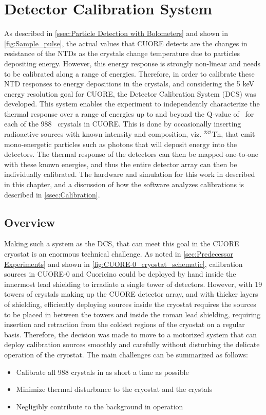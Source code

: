 \chapter{Detector Calibration System}
\label{chap:DCS}

As described in \autoref{ssec:Particle Detection with Bolometers} and shown in \autoref{fig:Sample_pulse}, the actual values that CUORE detects are the changes in resistance of the NTDs as the crystals change temperature due to particles depositing energy.
However, this energy response is strongly non-linear and needs to be calibrated along a range of energies.
Therefore, in order to calibrate these NTD responses to energy depositions in the crystals, and considering the 5 keV energy resolution goal for CUORE, the Detector Calibration System (DCS) was developed.
This system enables the experiment to independently characterize the thermal response over a range of energies up to and beyond the Q-value of \zeronubb~for each of the 988 \teotwo~crystals in CUORE.
This is done by occasionally inserting radioactive sources with known intensity and composition, viz. $^{232}$Th, that emit mono-energetic particles such as photons that will deposit energy into the detectors.
The thermal response of the detectors can then be mapped one-to-one with these known energies, and thus the entire detector array can then be individually calibrated. The hardware and simulation for this work in described in this chapter, and a discussion of how the software analyzes calibrations is described in \autoref{ssec:Calibration}.

\section{Overview}
\label{sec:DCS_Overview}

Making such a system as the DCS, that can meet this goal in the CUORE cryostat is an enormous technical challenge.
As noted in \autoref{sec:Predecessor Experiments} and shown in \autoref{fig:CUORE-0_cryostat_schematic}, calibration sources in CUORE-0 and Cuoricino could be deployed by hand inside the innermost lead shielding to irradiate a single tower of detectors.
However, with 19 towers of crystals making up the CUORE detector array, and with thicker layers of shielding, efficiently deploying sources inside the cryostat requires the sources to be placed in between the towers and inside the roman lead shielding, requiring insertion and retraction from the coldest regions of the cryostat on a regular basis.
Therefore, the decision was made to move to a motorized system that can deploy calibration sources smoothly and carefully without disturbing the delicate operation of the cryostat.
The main challenges can be summarized as follows: 
\begin{itemize}
\item Calibrate all 988 crystals in as short a time as possible
\item Minimize thermal disturbance to the cryostat and the crystals
\item Negligibly contribute to the background in operation
\end{itemize}

